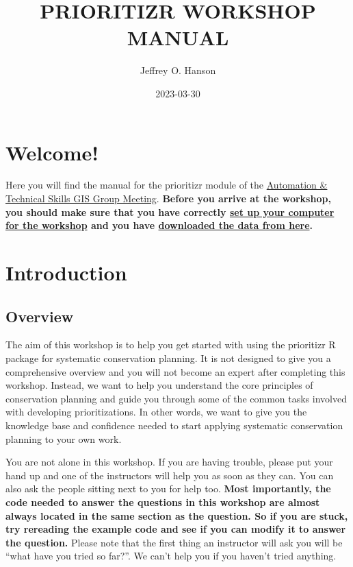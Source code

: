 \documentclass[
  12pt,
]{book}
\title{PRIORITIZR WORKSHOP MANUAL}
\author{Jeffrey O. Hanson}
\date{2023-03-30}
\begin{document}
\maketitle

{
\hypersetup{linkcolor=}
\setcounter{tocdepth}{0}
\tableofcontents
}
\hypertarget{welcome}{%
\chapter{Welcome!}\label{welcome}}

Here you will find the manual for the prioritizr module of the \href{https://prioritizr.github.io/NCC-workshop/}{Automation \& Technical Skills GIS Group Meeting}. \textbf{Before you arrive at the workshop, you should make sure that you have correctly \protect\hyperlink{setup}{set up your computer for the workshop} and you have \href{https://github.com/prioritizr/NCC-workshop/raw/main/data.zip}{downloaded the data from here}.}

\hypertarget{introduction}{%
\chapter{Introduction}\label{introduction}}

\hypertarget{overview}{%
\section{Overview}\label{overview}}

The aim of this workshop is to help you get started with using the prioritizr R package for systematic conservation planning. It is not designed to give you a comprehensive overview and you will not become an expert after completing this workshop. Instead, we want to help you understand the core principles of conservation planning and guide you through some of the common tasks involved with developing prioritizations. In other words, we want to give you the knowledge base and confidence needed to start applying systematic conservation planning to your own work.

You are not alone in this workshop. If you are having trouble, please put your hand up and one of the instructors will help you as soon as they can. You can also ask the people sitting next to you for help too. \textbf{Most importantly, the code needed to answer the questions in this workshop are almost always located in the same section as the question. So if you are stuck, try rereading the example code and see if you can modify it to answer the question.} Please note that the first thing an instructor will ask you will be ``what have you tried so far?''. We can't help you if you haven't tried anything.
\end{document}
